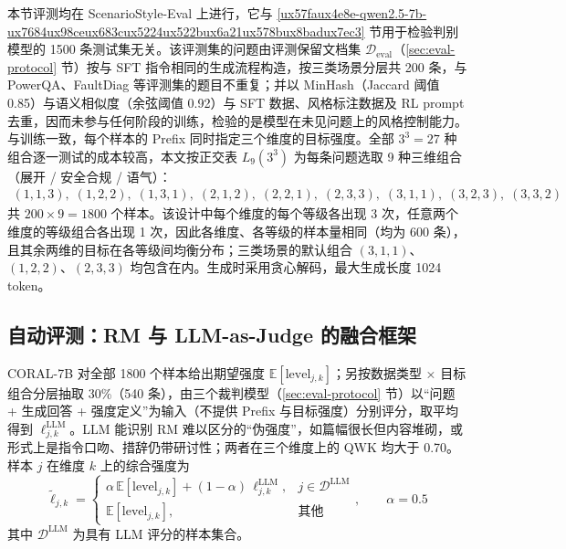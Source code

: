 \documentclass[fontset=fandol,type=master,campus=shenzhen,etitleauto=true]{hithesisbook}
\begin{document}
本节评测均在 ScenarioStyle-Eval 上进行，它与 \ref{ux57faux4e8e-qwen2.5-7b-ux7684ux98ceux683cux5224ux522bux6a21ux578bux8badux7ec3} 节用于检验判别模型的 1500 条测试集无关。该评测集的问题由评测保留文档集 $\mathcal{D}_{\text{eval}}$（\ref{sec:eval-protocol} 节）按与 SFT 指令相同的生成流程构造，按三类场景分层共 200 条，与 PowerQA、FaultDiag 等评测集的题目不重复；并以 MinHash（Jaccard 阈值 0.85）与语义相似度（余弦阈值 0.92）与 SFT 数据、风格标注数据及 RL prompt 去重，因而未参与任何阶段的训练，检验的是模型在未见问题上的风格控制能力。与训练一致，每个样本的 Prefix 同时指定三个维度的目标强度。全部 $3^3 = 27$ 种组合逐一测试的成本较高，本文按正交表 $L_9(3^3)$ 为每条问题选取 9 种三维组合（展开 / 安全合规 / 语气）：
\begin{equation*}
\begin{gathered}
(1,1,3),\; (1,2,2),\; (1,3,1),\; (2,1,2),\; (2,2,1),\; (2,3,3),\; (3,1,1),\; (3,2,3),\; (3,3,2)
\end{gathered}
\end{equation*}
共 $200 \times 9 = 1800$ 个样本。该设计中每个维度的每个等级各出现 3 次，任意两个维度的等级组合各出现 1 次，因此各维度、各等级的样本量相同（均为 600 条），且其余两维的目标在各等级间均衡分布；三类场景的默认组合 $(3,1,1)$、$(1,2,2)$、$(2,3,3)$ 均包含在内。生成时采用贪心解码，最大生成长度 1024 token。

\subsection{自动评测：RM 与 LLM-as-Judge 的融合框架}\label{ux81eaux52a8ux8bc4ux6d4b}

CORAL-7B 对全部 1800 个样本给出期望强度 $\mathbb{E}[\text{level}_{j,k}]$；另按数据类型 × 目标组合分层抽取 30\%（540 条），由三个裁判模型（\ref{sec:eval-protocol} 节）以“问题 + 生成回答 + 强度定义”为输入（不提供 Prefix 与目标强度）分别评分，取平均得到 $\ell^{\text{LLM}}_{j,k}$。LLM 能识别 RM 难以区分的“伪强度”，如篇幅很长但内容堆砌，或形式上是指令口吻、措辞仍带研讨性；两者在三个维度上的 QWK 均大于 0.70。样本 $j$ 在维度 $k$ 上的综合强度为
\begin{equation}\label{eq:fused-level}
\tilde{\ell}_{j,k} = \begin{cases} \alpha\, \mathbb{E}[\text{level}_{j,k}] + (1 - \alpha)\, \ell^{\text{LLM}}_{j,k}, & j \in \mathcal{D}^{\text{LLM}} \\ \mathbb{E}[\text{level}_{j,k}], & \text{其他} \end{cases}, \qquad \alpha = 0.5
\end{equation}
其中 $\mathcal{D}^{\text{LLM}}$ 为具有 LLM 评分的样本集合。
\end{document}
